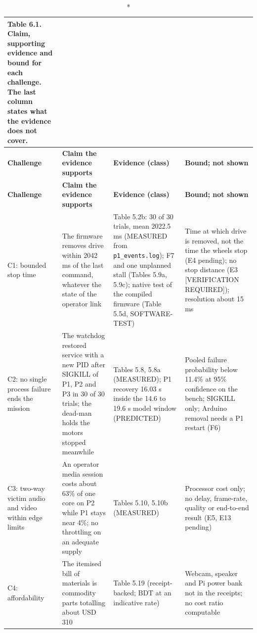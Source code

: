 \begin{center}
\footnotesize
\begin{longtable}{|p{2.3cm}|p{4cm}|p{4cm}|p{4cm}|}
\caption*{Table 6.1. Claim, supporting evidence and bound for each challenge. The last column states what the evidence does not cover.}
\addcontentsline{lot}{table}{\protect\numberline{6.1}Claim, supporting evidence and bound for each challenge. The last column states what the evidence does not cover.}
\\
\hline
\textbf{Challenge} & \textbf{Claim the evidence supports} & \textbf{Evidence (class)} & \textbf{Bound; not shown} \\
\hline
\endfirsthead
\hline
\textbf{Challenge} & \textbf{Claim the evidence supports} & \textbf{Evidence (class)} & \textbf{Bound; not shown} \\
\hline
\endhead
C1: bounded stop time & The firmware removes drive within 2042 ms of the last command, whatever the state of the operator link & Table 5.2b: 30 of 30 trials, mean 2022.5 ms (MEASURED from \texttt{p1\_events.log}); F7 and one unplanned stall (Tables 5.9a, 5.9c); native test of the compiled firmware (Table 5.5d, SOFTWARE-TEST) & Time at which drive is removed, not the time the wheels stop (E4 pending); no stop distance (E3 [VERIFICATION REQUIRED]); resolution about 15 ms \\
\hline
C2: no single process failure ends the mission & The watchdog restored service with a new PID after SIGKILL of P1, P2 and P3 in 30 of 30 trials; the dead-man holds the motors stopped meanwhile & Tables 5.8, 5.8a (MEASURED); P1 recovery 16.03 s inside the 14.6 to 19.6 s model window (PREDICTED) & Pooled failure probability below 11.4\% at 95\% confidence on the bench; SIGKILL only; Arduino removal needs a P1 restart (F6) \\
\hline
C3: two-way victim audio and video within edge limits & An operator media session costs about 63\% of one core on P2 while P1 stays near 4\%; no throttling on an adequate supply & Tables 5.10, 5.10b (MEASURED) & Processor cost only; no delay, frame-rate, quality or end-to-end result (E5, E13 pending) \\
\hline
C4: affordability & The itemised bill of materials is commodity parts totalling about USD 310 & Table 5.19 (receipt-backed; BDT at an indicative rate) & Webcam, speaker and Pi power bank not in the receipts; no cost ratio computable \\
\hline
\end{longtable}
\end{center}

